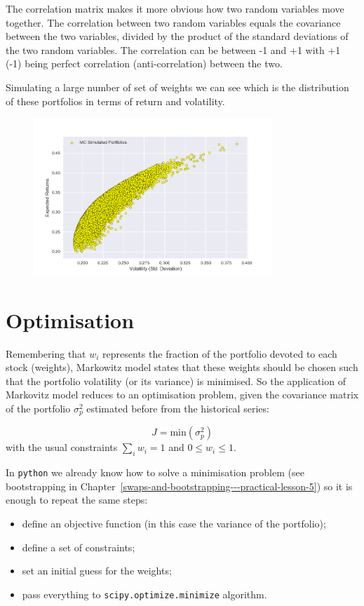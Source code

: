     The correlation matrix makes it more obvious how two random variables
move together. The correlation between two random variables equals the
covariance between the two variables, divided by the product of the
standard deviations of the two random variables. The correlation can be
between -1 and +1 with +1 (-1) being perfect correlation
(anti-correlation) between the two.

Simulating a large number of set of weights we can see which is the
distribution of these portfolios in terms of return and volatility.

    \begin{figure}
    \centering
    \includegraphics[width=0.8\textwidth]{figures/Figure_1.png}
    \end{figure}


\section{Optimisation}\label{optimization}

Remembering that \(w_i\) represents the fraction of the portfolio
devoted to each stock (weights), Markowitz model states that these
weights should be chosen such that the portfolio volatility (or its
variance) is minimised. So the application of Markovitz model reduces to
an optimisation problem, given the covariance matrix of the portfolio
\(\sigma_p^2\) estimated before from the historical series:

\[ J = \textrm{min}(\sigma_p^2) \]
with the usual constraints \(\sum_{i}w_i = 1\) and \(0 \le w_i \le 1\).

In \texttt{python} we already know how to solve a minimisation problem
(see bootstrapping in Chapter~\ref{swaps-and-bootstrapping---practical-lesson-5}) so it is enough to repeat the same steps:

\begin{itemize}
\tightlist
\item
  define an objective function (in this case the variance of the
  portfolio);
\item
  define a set of constraints;
\item
  set an initial guess for the weights;
\item
  pass everything to \texttt{scipy.optimize.minimize} algorithm.
\end{itemize}

